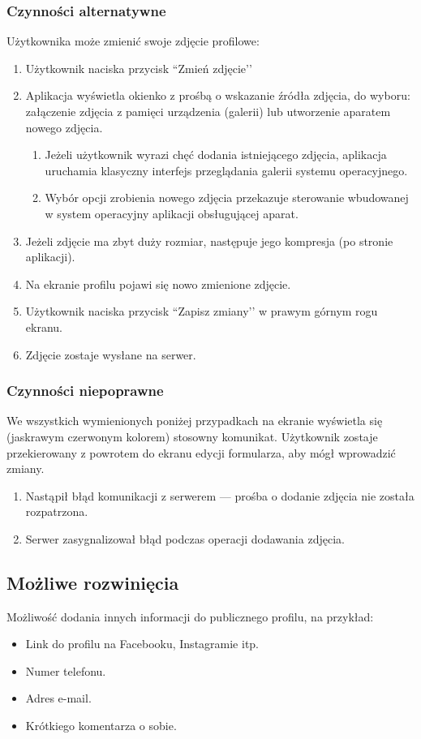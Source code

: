 \documentclass[12pt,a4paper,twoside]{article}
\begin{document}
    \subsubsection{Czynności alternatywne}
    Użytkownika może zmienić swoje zdjęcie profilowe:
    \begin{enumerate}
        \item Użytkownik naciska przycisk ``Zmień zdjęcie’’
        \item Aplikacja wyświetla okienko z prośbą o wskazanie źródła zdjęcia, do wyboru: załączenie zdjęcia z pamięci urządzenia (galerii)
        lub utworzenie aparatem nowego zdjęcia.
        \begin{enumerate}
            \item Jeżeli użytkownik wyrazi chęć dodania istniejącego zdjęcia, aplikacja uruchamia klasyczny interfejs przeglądania galerii
            systemu operacyjnego.
            \item Wybór opcji zrobienia nowego zdjęcia przekazuje sterowanie wbudowanej w system operacyjny aplikacji obsługującej aparat.
        \end{enumerate}
        \item Jeżeli zdjęcie ma zbyt duży rozmiar, następuje jego kompresja (po stronie aplikacji).
        \item Na ekranie profilu pojawi się nowo zmienione zdjęcie.
        \item Użytkownik naciska przycisk ``Zapisz zmiany’’ w prawym górnym rogu ekranu.
        \item Zdjęcie zostaje wysłane na serwer.
    \end{enumerate}


    \subsubsection{Czynności niepoprawne}
    We wszystkich wymienionych poniżej przypadkach na ekranie wyświetla się (jaskrawym czerwonym kolorem) stosowny komunikat. Użytkownik zostaje
    przekierowany z powrotem do ekranu edycji formularza, aby mógł wprowadzić zmiany.
    \begin{enumerate}
        \item Nastąpił błąd komunikacji z serwerem --- prośba o dodanie zdjęcia nie została rozpatrzona.
        \item Serwer zasygnalizował błąd podczas operacji dodawania zdjęcia.
    \end{enumerate}

    \subsection{Możliwe rozwinięcia}
    Możliwość dodania innych informacji do publicznego profilu, na przykład:
    \begin{itemize}
        \item Link do profilu na Facebooku, Instagramie itp.
        \item Numer telefonu.
        \item Adres e-mail.
        \item Krótkiego komentarza o sobie.
    \end{itemize}
\end{document}
